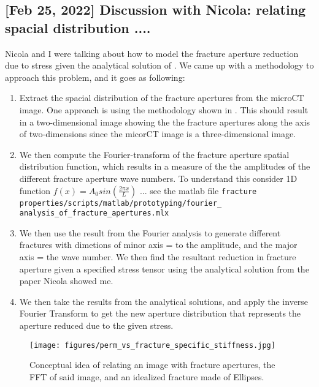 \documentclass[11pt,titlepage]{article}
\begin{document}
\subsection{[Feb 25, 2022] Discussion with Nicola: relating spacial distribution .... }
Nicola and I were talking about how to model the fracture aperture reduction due to stress given the analytical solution of . We came up with a methodology to approach this problem, and it goes as following:
\begin{enumerate}
\item Extract the spacial distribution of the fracture apertures from the microCT image. One approach is using the methodology shown in \citep[see][fig. 5]{Zhao2018}. This should result in a two-dimensional image showing the the fracture apertures along the axis of two-dimensions since the micorCT image is a three-dimensional image.

\item We then compute the Fourier-transform of the fracture aperture spatial distribution function, which results in a measure of the the amplitudes of the different fracture aperture wave numbers. To understand this consider 1D function $f(x) = A_0 sin(\frac{2\pi x}{L})$ ... see the matlab file \texttt{fracture properties/scripts/matlab/prototyping/fourier\_ analysis\_of\_fracture\_apertures.mlx}

\item We then use the result from the Fourier analysis to generate different fractures with dimetions of minor axis = to the amplitude, and the major axis = the wave number. We then find the resultant reduction in fracture aperture given a specified stress tensor using the analytical solution from the paper Nicola showed me.

\item We then take the results from the analytical solutions, and apply the inverse Fourier Transform to get the new aperture distribution that represents the aperture reduced due to the given stress. 
\end{enumerate}

\begin{figure}[!ht]
\centering
\texttt{[image: figures/perm\_vs\_fracture\_specific\_stiffness.jpg]}
\caption{Conceptual idea of relating an image with fracture apertures, the FFT of said image, and an idealized fracture made of Ellipses.}
\label{fig:concept}
\end{figure}
\end{document}
